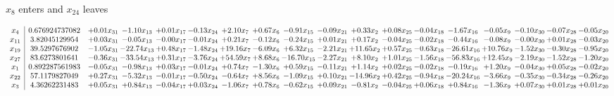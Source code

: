 \documentclass[9pt]{article}
\begin{document}
 $ x_{8} $ enters and $ x_{24} $ leaves 

 \[\begin{array}{c| c c@{\hskip 2pt} c@{\hskip 2pt} c@{\hskip 2pt} c@{\hskip 2pt} c@{\hskip 2pt} c@{\hskip 2pt} c@{\hskip 2pt} c@{\hskip 2pt} c@{\hskip 2pt} c@{\hskip 2pt} c@{\hskip 2pt} c@{\hskip 2pt} c@{\hskip 2pt} c@{\hskip 2pt} c@{\hskip 2pt} c@{\hskip 2pt} }
 x_{4}   &  0.676924737082 & +  0.01 x_{31} & -1.10 x_{13} & +  0.01 x_{17} & -0.13 x_{24} & +  2.10 x_{7} & +  0.67 x_{6} & -0.91 x_{15} & -0.09 x_{21} & +  0.33 x_{2} & +  0.08 x_{25} & -0.04 x_{18} & -1.67 x_{16} & -0.05 x_{9} & -0.10 x_{30} & -0.07 x_{28} & -0.05 x_{20}\\
 x_{11}   &  3.82045129954 & +  0.03 x_{31} & -0.05 x_{13} & -0.00 x_{17} & -0.01 x_{24} & +  0.21 x_{7} & -0.12 x_{6} & -0.24 x_{15} & +  0.01 x_{21} & +  0.17 x_{2} & -0.04 x_{25} & -0.02 x_{18} & -0.44 x_{16} & -0.08 x_{9} & -0.00 x_{30} & +  0.01 x_{28} & -0.03 x_{20}\\
 x_{19}   &  39.5297676902 & -1.05 x_{31} & -22.74 x_{13} & +  0.48 x_{17} & -1.48 x_{24} & + 19.16 x_{7} & -6.09 x_{6} & +  6.32 x_{15} & -2.21 x_{21} & + 11.65 x_{2} & +  0.57 x_{25} & -0.63 x_{18} & -26.61 x_{16} & + 10.76 x_{9} & -1.52 x_{30} & -0.30 x_{28} & -0.95 x_{20}\\
 x_{27}   &  83.6273801641 & -0.36 x_{31} & -33.54 x_{13} & +  0.31 x_{17} & -3.76 x_{24} & + 54.59 x_{7} & +  8.68 x_{6} & -16.70 x_{15} & -2.27 x_{21} & +  8.10 x_{2} & +  1.01 x_{25} & -1.56 x_{18} & -56.83 x_{16} & + 12.45 x_{9} & -2.19 x_{30} & -1.52 x_{28} & -1.20 x_{20}\\
 x_{1}   &  0.892287561983 & -0.05 x_{31} & -0.98 x_{13} & +  0.03 x_{17} & -0.01 x_{24} & +  0.74 x_{7} & -1.30 x_{6} & +  0.59 x_{15} & -0.11 x_{21} & +  1.14 x_{2} & +  0.02 x_{25} & -0.02 x_{18} & -0.19 x_{16} & +  1.20 x_{9} & -0.04 x_{30} & +  0.05 x_{28} & -0.02 x_{20}\\
 x_{22}   &  57.1179827049 & +  0.27 x_{31} & -5.32 x_{13} & -0.01 x_{17} & -0.50 x_{24} & -0.64 x_{7} & +  8.56 x_{6} & -1.09 x_{15} & +  0.10 x_{21} & -14.96 x_{2} & +  0.42 x_{25} & -0.94 x_{18} & -20.24 x_{16} & -3.66 x_{9} & -0.35 x_{30} & -0.34 x_{28} & -0.26 x_{20}\\
 x_{3}   &  4.36262231483 & +  0.05 x_{31} & +  0.84 x_{13} & -0.04 x_{17} & +  0.03 x_{24} & -1.06 x_{7} & +  0.78 x_{6} & -0.62 x_{15} & +  0.09 x_{21} & -0.81 x_{2} & -0.04 x_{25} & +  0.06 x_{18} & +  0.84 x_{16} & -1.36 x_{9} & +  0.07 x_{30} & +  0.01 x_{28} & +  0.01 x_{20}\\

\end{array}\]
\end{document}
